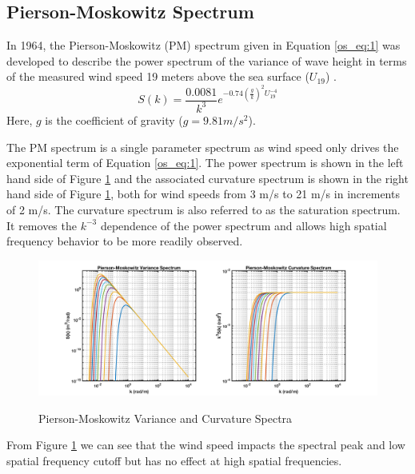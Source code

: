 \subsection{Pierson-Moskowitz Spectrum}
In 1964, the Pierson-Moskowitz (PM) spectrum given in Equation \ref{os_eq:1} was developed to describe the power spectrum of the variance of wave height in terms of the measured wind speed 19 meters above the sea surface ($U_{19}$) \cite{michel_sea_spectra}. 
 \begin{equation}
S(k) = \frac{0.0081}{k^3}e^{-0.74\left(\frac{g}{k}\right)^2U_{19}^{-4}}
\label{os_eq:1}
\end{equation}
 \renewcommand{\baselinestretch}{2} \small\normalsize
Here, $g$ is the coefficient of gravity ($g = 9.81 m/s^2$). 
 
The PM spectrum is a single parameter spectrum as wind speed only drives the exponential term of Equation \ref{os_eq:1}. The power spectrum is shown in the left hand side of Figure \ref{os_fig:1} and the associated curvature spectrum is shown in the right hand side of Figure \ref{os_fig:1}, both for wind speeds from 3 m/s to 21 m/s in increments of 2 m/s. The curvature spectrum is also referred to as the saturation spectrum. It removes the $k^{-3}$ dependence of the power spectrum and allows high spatial frequency behavior to be more readily observed.
 
 \begin{figure}[H]
  \begin{center}
\includegraphics[width=6in]{../media/Ocean_Surface/PM_variance_curvature_spectrum.png}
  \end{center}
  \renewcommand{\baselinestretch}{1} \small\normalsize
  \begin{quote}
    \caption[Pierson-Moskowitz Variance and Curvature Spectra]{Pierson-Moskowitz Variance and Curvature Spectra\label{os_fig:1}}
  \end{quote}
\end{figure}
 \renewcommand{\baselinestretch}{2} \small\normalsize
From Figure \ref{os_fig:1} we can see that the wind speed impacts the spectral peak and low spatial frequency cutoff but has no effect at high spatial frequencies.
 
